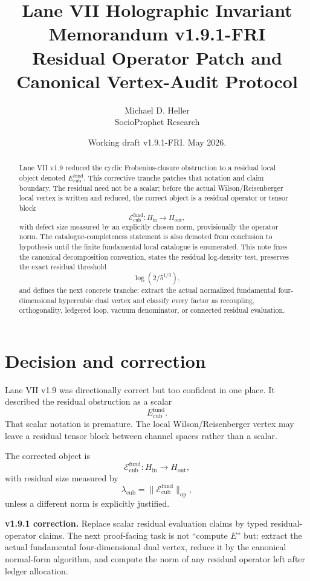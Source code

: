 \documentclass[11pt]{article}
\title{Lane VII Holographic Invariant Memorandum v1.9.1-FRI\\
\large Residual Operator Patch and Canonical Vertex-Audit Protocol}
\author{Michael D. Heller\\SocioProphet Research}
\date{Working draft v1.9.1-FRI. May 2026.}
\begin{document}
\maketitle

\begin{abstract}
Lane VII v1.9 reduced the cyclic Frobenius-closure obstruction to a residual local object denoted $E_{\mathrm{cub}}^{\mathrm{fund}}$. This corrective tranche patches that notation and claim boundary. The residual need not be a scalar; before the actual Wilson/Reisenberger local vertex is written and reduced, the correct object is a residual operator or tensor block
\[
  \mathcal E_{\mathrm{cub}}^{\mathrm{fund}}:H_{\mathrm{in}}\to H_{\mathrm{out}},
\]
with defect size measured by an explicitly chosen norm, provisionally the operator norm. The catalogue-completeness statement is also demoted from conclusion to hypothesis until the finite fundamental local catalogue is enumerated. This note fixes the canonical decomposition convention, states the residual log-density test, preserves the exact residual threshold
\[
  \log(2/5^{1/3}),
\]
and defines the next concrete tranche: extract the actual normalized fundamental four-dimensional hypercubic dual vertex and classify every factor as recoupling, orthogonality, ledgered loop, vacuum denominator, or connected residual evaluation.
\end{abstract}

\section{Decision and correction}

Lane VII v1.9 was directionally correct but too confident in one place. It described the residual obstruction as a scalar
\[
  E_{\mathrm{cub}}^{\mathrm{fund}}.
\]
That scalar notation is premature. The local Wilson/Reisenberger vertex may leave a residual tensor block between channel spaces rather than a scalar.

The corrected object is
\[
  \mathcal E_{\mathrm{cub}}^{\mathrm{fund}}:H_{\mathrm{in}}\to H_{\mathrm{out}},
\]
with residual size measured by
\[
  \lambda_{\mathrm{cub}}=\|\mathcal E_{\mathrm{cub}}^{\mathrm{fund}}\|_{\mathrm{op}},
\]
unless a different norm is explicitly justified.

\begin{claimbox}
\textbf{v1.9.1 correction.} Replace scalar residual evaluation claims by typed residual-operator claims. The next proof-facing task is not ``compute $E$'' but: extract the actual fundamental four-dimensional dual vertex, reduce it by the canonical normal-form algorithm, and compute the norm of any residual operator left after ledger allocation.
\end{claimbox}
\end{document}
